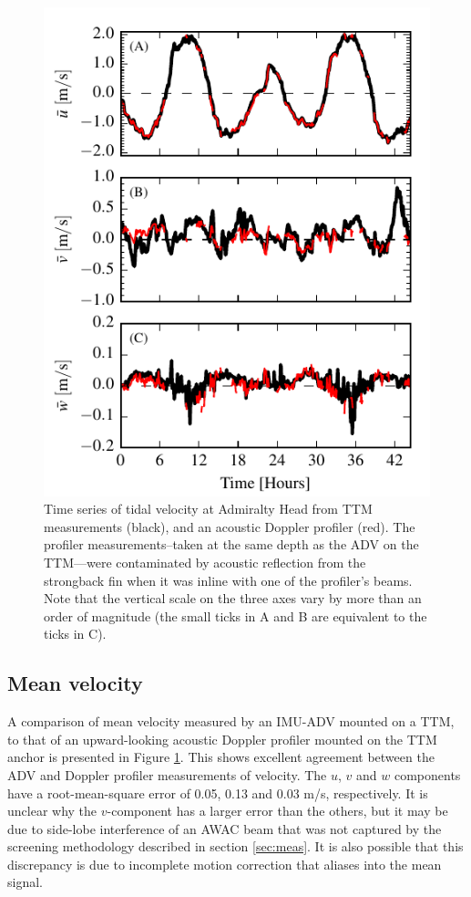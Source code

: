 \documentclass[twocol]{ametsoc}
\begin{document}
\begin{figure}[t]
  \centering
  \includegraphics{TimeFig02}
  \caption{Time series of tidal velocity at Admiralty Head from TTM measurements (black), and an acoustic Doppler profiler (red). The profiler measurements--taken at the same depth as the ADV on the TTM---were contaminated by acoustic reflection from the strongback fin when it was inline with one of the profiler's beams. Note that the vertical scale on the three axes vary by more than an order of magnitude (the small ticks in A and B are equivalent to the ticks in C).}
  \label{fig:vel_time}
\end{figure}

\subsection{Mean velocity}

A comparison of mean velocity measured by an IMU-ADV mounted on a TTM, to that of an upward-looking acoustic Doppler profiler mounted on the TTM anchor is presented in Figure \ref{fig:vel_time}. This shows excellent agreement between the ADV and Doppler profiler measurements of velocity. The $u$, $v$ and $w$ components have a root-mean-square error of 0.05, 0.13 and 0.03 m/s, respectively. 
It is unclear why the $v$-component has a larger error than the others, but it may be due to side-lobe interference of an AWAC beam that was not captured by the screening methodology described in section \ref{sec:meas}. It is also possible that this discrepancy is due to incomplete motion correction that aliases into the mean signal.
\end{document}
